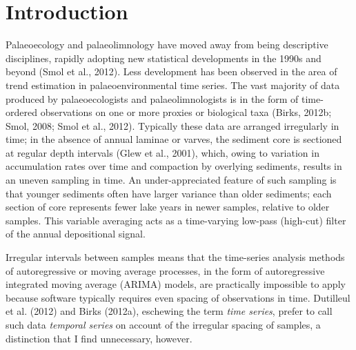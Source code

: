 \documentclass[12pt,]{article}
\begin{document}
\section{Introduction}\label{introduction}

Palaeoecology and palaeolimnology have moved away from being descriptive
disciplines, rapidly adopting new statistical developments in the 1990s
and beyond (Smol et al., 2012). Less development has been observed in
the area of trend estimation in palaeoenvironmental time series. The
vast majority of data produced by palaeoecologists and
palaeolimnologists is in the form of time-ordered observations on one or
more proxies or biological taxa (Birks, 2012b; Smol, 2008; Smol et al.,
2012). Typically these data are arranged irregularly in time; in the
absence of annual laminae or varves, the sediment core is sectioned at
regular depth intervals (Glew et al., 2001), which, owing to variation
in accumulation rates over time and compaction by overlying sediments,
results in an uneven sampling in time. An under-appreciated feature of
such sampling is that younger sediments often have larger variance than
older sediments; each section of core represents fewer lake years in
newer samples, relative to older samples. This variable averaging acts
as a time-varying low-pass (high-cut) filter of the annual depositional
signal.

Irregular intervals between samples means that the time-series analysis
methods of autoregressive or moving average processes, in the form of
autoregressive integrated moving average (ARIMA) models, are practically
impossible to apply because software typically requires even spacing of
observations in time. Dutilleul et al. (2012) and Birks (2012a),
eschewing the term \emph{time series}, prefer to call such data
\emph{temporal series} on account of the irregular spacing of samples, a
distinction that I find unnecessary, however.
\end{document}
